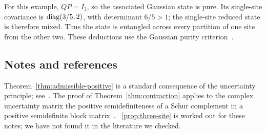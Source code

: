 For this example, $QP=I_3$, so the associated Gaussian state is pure. Its
single-site covariance is $\operatorname{diag}(3/5,2)$, with determinant $6/5>1$; the
single-site reduced state is therefore mixed. Thus the state is entangled
across every partition of one site from the other two. These deductions use
the Gaussian purity criterion~\cite{weedbrook}.

\begin{vetxenv}
\subsection*{Notes and references}
Theorem~\ref{thm:admissible-positive} is a standard consequence of the uncertainty principle; see~\cite[Sec.~IX]{adms}. The
proof of Theorem~\ref{thm:contraction} applies to the complex uncertainty matrix the positive semidefiniteness of a Schur
complement in a positive semidefinite block matrix~\cite[Sec.~7.7]{hj}. ~\ref{prop:three-site} is worked out
for these notes; we have not found it in the literature we checked.
\end{vetxenv}